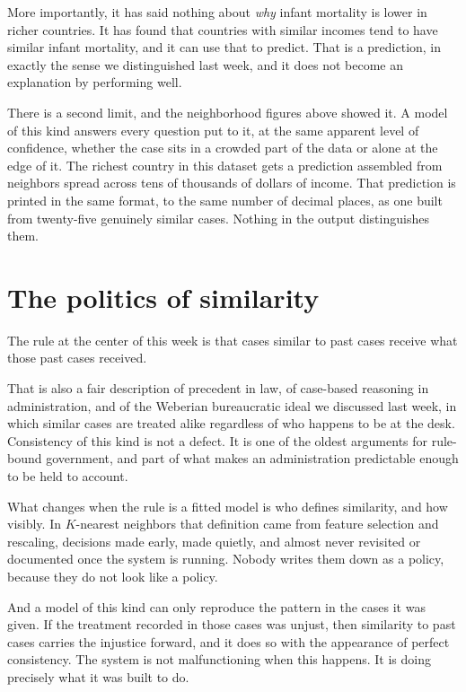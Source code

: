 \documentclass[
  a4paper,
]{scrbook}
\begin{document}
More importantly, it has said nothing about \emph{why} infant mortality
is lower in richer countries. It has found that countries with similar
incomes tend to have similar infant mortality, and it can use that to
predict. That is a prediction, in exactly the sense we distinguished
last week, and it does not become an explanation by performing well.

There is a second limit, and the neighborhood figures above showed it. A
model of this kind answers every question put to it, at the same
apparent level of confidence, whether the case sits in a crowded part of
the data or alone at the edge of it. The richest country in this dataset
gets a prediction assembled from neighbors spread across tens of
thousands of dollars of income. That prediction is printed in the same
format, to the same number of decimal places, as one built from
twenty-five genuinely similar cases. Nothing in the output distinguishes
them.

\chapter{The politics of similarity}\label{the-politics-of-similarity}

The rule at the center of this week is that cases similar to past cases
receive what those past cases received.

That is also a fair description of precedent in law, of case-based
reasoning in administration, and of the Weberian bureaucratic ideal we
discussed last week, in which similar cases are treated alike regardless
of who happens to be at the desk. Consistency of this kind is not a
defect. It is one of the oldest arguments for rule-bound government, and
part of what makes an administration predictable enough to be held to
account.

What changes when the rule is a fitted model is who defines similarity,
and how visibly. In \(K\)-nearest neighbors that definition came from
feature selection and rescaling, decisions made early, made quietly, and
almost never revisited or documented once the system is running. Nobody
writes them down as a policy, because they do not look like a policy.

And a model of this kind can only reproduce the pattern in the cases it
was given. If the treatment recorded in those cases was unjust, then
similarity to past cases carries the injustice forward, and it does so
with the appearance of perfect consistency. The system is not
malfunctioning when this happens. It is doing precisely what it was
built to do.
\end{document}

